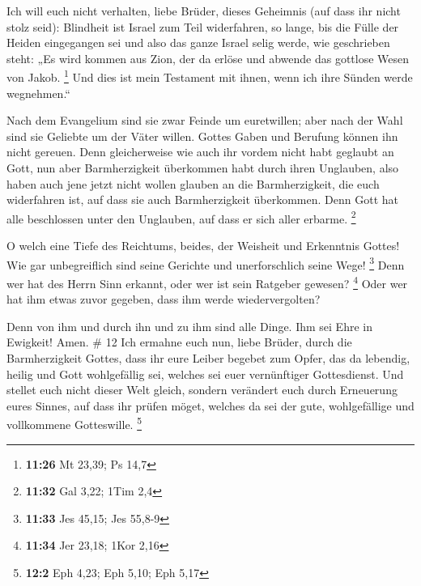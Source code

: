  Ich will euch nicht verhalten, liebe Brüder, dieses
Geheimnis (auf dass ihr nicht stolz seid): Blindheit ist Israel zum Teil
widerfahren, so lange, bis die Fülle der Heiden eingegangen sei
 und also das ganze Israel selig werde, wie geschrieben
steht: „Es wird kommen aus Zion, der da erlöse und abwende das gottlose
Wesen von Jakob. \footnote{\textbf{11:26} Mt 23,39; Ps 14,7}
 Und dies ist mein Testament mit ihnen, wenn ich ihre
Sünden werde wegnehmen.``

 Nach dem Evangelium sind sie zwar Feinde um euretwillen;
aber nach der Wahl sind sie Geliebte um der Väter willen.
 Gottes Gaben und Berufung können ihn nicht gereuen.
 Denn gleicherweise wie auch ihr vordem nicht habt
geglaubt an Gott, nun aber Barmherzigkeit überkommen habt durch ihren
Unglauben,  also haben auch jene jetzt nicht wollen
glauben an die Barmherzigkeit, die euch widerfahren ist, auf dass sie
auch Barmherzigkeit überkommen.  Denn Gott hat alle
beschlossen unter den Unglauben, auf dass er sich aller erbarme.
\footnote{\textbf{11:32} Gal 3,22; 1Tim 2,4}

 O welch eine Tiefe des Reichtums, beides, der Weisheit
und Erkenntnis Gottes! Wie gar unbegreiflich sind seine Gerichte und
unerforschlich seine Wege! \footnote{\textbf{11:33} Jes 45,15; Jes
  55,8-9}  Denn wer hat des Herrn Sinn erkannt, oder wer
ist sein Ratgeber gewesen? \footnote{\textbf{11:34} Jer 23,18; 1Kor 2,16}
 Oder wer hat ihm etwas zuvor gegeben, dass ihm werde
wiedervergolten?

 Denn von ihm und durch ihn und zu ihm sind alle Dinge.
Ihm sei Ehre in Ewigkeit! Amen. \# 12  Ich ermahne euch
nun, liebe Brüder, durch die Barmherzigkeit Gottes, dass ihr eure Leiber
begebet zum Opfer, das da lebendig, heilig und Gott wohlgefällig sei,
welches sei euer vernünftiger Gottesdienst.  Und stellet
euch nicht dieser Welt gleich, sondern verändert euch durch Erneuerung
eures Sinnes, auf dass ihr prüfen möget, welches da sei der gute,
wohlgefällige und vollkommene Gotteswille. \footnote{\textbf{12:2} Eph
  4,23; Eph 5,10; Eph 5,17}

